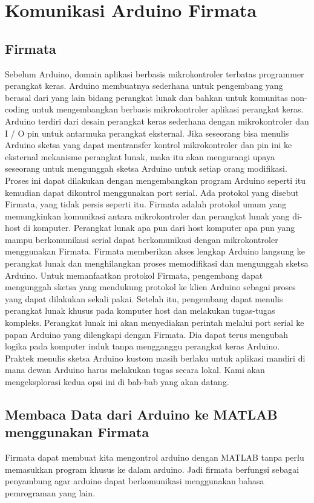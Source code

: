 \section{Komunikasi Arduino Firmata}
\subsection{Firmata}
	Sebelum Arduino, domain aplikasi berbasis mikrokontroler terbatas programmer perangkat keras. Arduino membuatnya sederhana untuk pengembang yang berasal dari yang lain bidang perangkat lunak dan bahkan untuk komunitas non-coding untuk mengembangkan berbasis mikrokontroler aplikasi perangkat keras. 
	Arduino terdiri dari desain perangkat keras sederhana dengan mikrokontroler dan I / O pin untuk antarmuka perangkat eksternal. Jika seseorang bisa menulis Arduino sketsa yang dapat mentransfer kontrol mikrokontroler dan pin ini ke eksternal mekanisme perangkat lunak, maka itu akan mengurangi upaya seseorang untuk mengunggah sketsa Arduino untuk setiap orang modifikasi. 
	Proses ini dapat dilakukan dengan mengembangkan program Arduino seperti itu kemudian dapat dikontrol menggunakan port serial. Ada protokol yang disebut Firmata, yang tidak persis seperti itu.
	Firmata adalah protokol umum yang memungkinkan komunikasi antara mikrokontroler dan perangkat lunak yang di-host di komputer.
	Perangkat lunak apa pun dari host komputer apa pun yang mampu berkomunikasi serial dapat berkomunikasi dengan mikrokontroler menggunakan Firmata. 
	Firmata memberikan akses lengkap Arduino langsung ke perangkat lunak dan menghilangkan proses memodifikasi dan mengunggah sketsa Arduino. 
	Untuk memanfaatkan protokol Firmata, pengembang dapat mengunggah sketsa yang mendukung protokol ke klien Arduino sebagai proses yang dapat dilakukan sekali pakai. 
	Setelah itu, pengembang dapat menulis perangkat lunak khusus pada komputer host dan melakukan tugas-tugas kompleks. Perangkat lunak ini akan menyediakan perintah melalui port serial ke papan Arduino yang dilengkapi dengan Firmata. Dia dapat terus mengubah logika pada komputer induk tanpa mengganggu perangkat keras Arduino. 
	Praktek menulis sketsa Arduino kustom masih berlaku untuk aplikasi mandiri di mana dewan Arduino harus melakukan tugas secara lokal. Kami akan mengeksplorasi kedua opsi ini di bab-bab yang akan datang.

\subsection{Membaca Data dari Arduino ke MATLAB menggunakan Firmata}
	Firmata dapat membuat kita mengontrol arduino dengan MATLAB tanpa perlu memasukkan program khusus ke dalam arduino. Jadi firmata berfungsi sebagai penyambung agar arduino dapat berkomunikasi menggunakan bahasa pemrograman yang lain.
	
